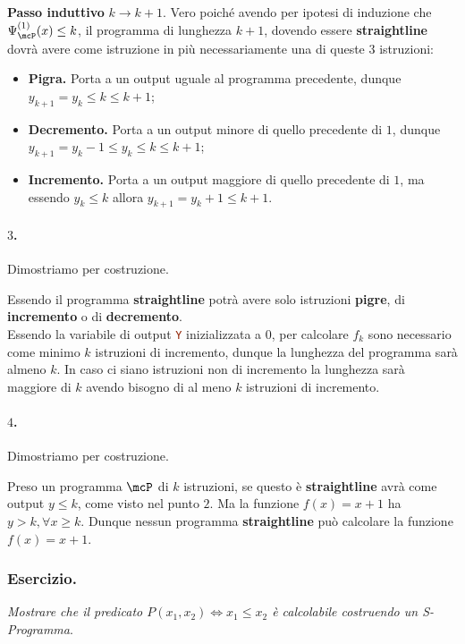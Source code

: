 \textbf{Passo induttivo} \(k\to k+1\). Vero poiché avendo per ipotesi di induzione che \(\Psi_{\mcP}^{(1)}(x)\leq k\), il programma di lunghezza \(k+1\), dovendo essere \textbf{straightline} dovrà avere come istruzione in più necessariamente una di queste \(3\) istruzioni:
\begin{itemize}
    \item \textbf{Pigra.} Porta a un output uguale al programma precedente, dunque \(y_{k+1}=y_k\leq k \leq k+1\);
    \item \textbf{Decremento.} Porta a un output minore di quello precedente di \(1\), dunque \(y_{k+1}=y_k-1\leq y_k \leq k \leq k+1\);
    \item \textbf{Incremento.} Porta a un output maggiore di quello precedente di \(1\), ma essendo \(y_k\leq k\) allora \(y_{k+1}=y_k+1\leq k+1\).
\end{itemize}

\paragraph*{\(3\).} Dimostriamo per costruzione.\label{Esercizio Straightline P lunghezza > k}

Essendo il programma \textbf{straightline} potrà avere solo istruzioni \textbf{pigre}, di \textbf{incremento} o di \textbf{decremento}. \\
Essendo la variabile di output \lstinline[language=ini]{Y} inizializzata a \(0\), per calcolare \(f_k\) sono necessario come minimo \(k\) istruzioni di incremento, dunque la lunghezza del programma sarà almeno \(k\).
In caso ci siano istruzioni non di incremento la lunghezza sarà maggiore di \(k\) avendo bisogno di al meno \(k\) istruzioni di incremento.

\paragraph*{\(4\).} Dimostriamo per costruzione.\label{Esercizio Straightline f(x)=x+1}

Preso un programma \(\mcP\) di \(k\) istruzioni, se questo è \textbf{straightline} avrà come output \(y\leq k\), come visto nel punto \(2\). Ma la funzione \(f(x)=x+1\) ha \(y>k, \forall x \geq k\).
Dunque nessun programma \textbf{straightline} può calcolare la funzione \(f(x)=x+1\).

\subsubsection*{Esercizio.} \textit{Mostrare che il predicato \(P(x_1, x_2)\iff x_1\leq x_2\) è calcolabile costruendo un S-Programma}.

